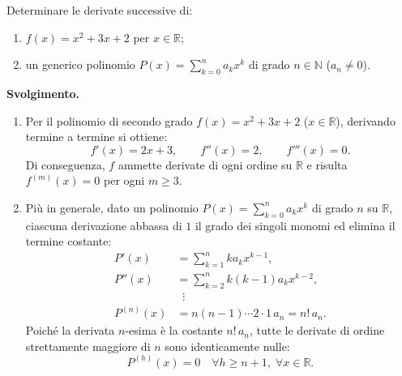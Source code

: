 \begin{esbox}
Determinare le derivate successive di:
\begin{enumerate}
    \item $f(x) = x^2 + 3x + 2$ per $x \in \mathbb{R}$;
    \item un generico polinomio $P(x) = \displaystyle\sum_{k=0}^{n} a_k x^k$ di grado $n \in \mathbb{N}$ ($a_n \neq 0$).
\end{enumerate}

\medskip
\noindent\textbf{Svolgimento.}
\begin{enumerate}
    \item Per il polinomio di secondo grado $f(x) = x^2 + 3x + 2$ ($x \in \mathbb{R}$), derivando termine a termine si ottiene:
    \[
        f'(x) = 2x + 3, \qquad f''(x) = 2, \qquad f'''(x) = 0.
    \]
    Di conseguenza, $f$ ammette derivate di ogni ordine su $\mathbb{R}$ e risulta $f^{(m)}(x) = 0$ per ogni $m \ge 3$.

    \item Più in generale, dato un polinomio $P(x) = \sum_{k=0}^{n} a_k x^k$ di grado $n$ su $\mathbb{R}$, ciascuna derivazione abbassa di $1$ il grado dei singoli monomi ed elimina il termine costante:
    \begin{align*}
        P'(x) &= \sum_{k=1}^{n} k a_k x^{k-1}, \\
        P''(x) &= \sum_{k=2}^{n} k(k-1) a_k x^{k-2}, \\
        &\;\;\vdots \\
        P^{(n)}(x) &= n(n-1)\cdots 2 \cdot 1 \, a_n = n!\, a_n.
    \end{align*}
    Poiché la derivata $n$-esima è la costante $n!\, a_n$, tutte le derivate di ordine strettamente maggiore di $n$ sono identicamente nulle:
    \[
        P^{(h)}(x) = 0 \quad \forall h \ge n + 1, \;\forall x \in \mathbb{R}.
    \]
\end{enumerate}
\end{esbox}

